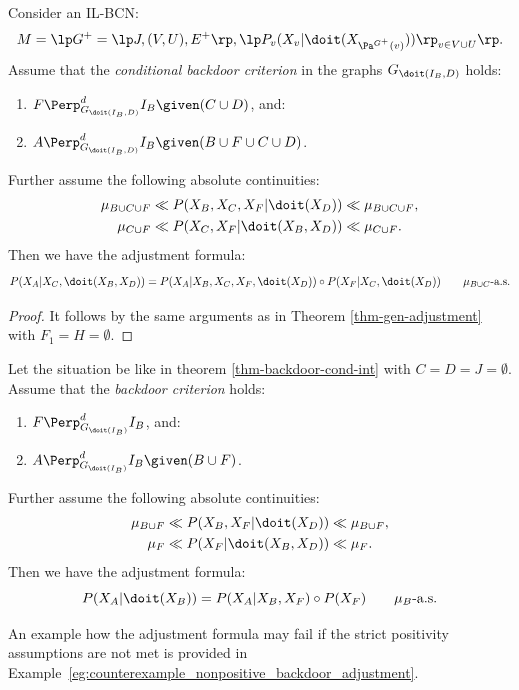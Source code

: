 \begin{Cor}
    \label{thm-backdoor-cond-int}
    Consider an IL-BCN:
        \[M= \lp G^+=\lp J,(V,U),E^+ \rp, \lp P_v ( X_v|\doit( X_{\Pa^{G^+}(v)})) \rp_{v \in V \cup U} \rp.\]
  Assume that the \emph{conditional backdoor criterion} in the graphs $G_{\doit(I_B,D)}$ holds:
\begin{enumerate}
    \item $\displaystyle F \Perp^d_{G_{\doit(I_B,D)}} I_B  \given (C \cup D)$, and:
    \item $\displaystyle A \Perp^d_{G_{\doit(I_B,D)}} I_B  \given (B \cup F \cup C \cup D)$.
\end{enumerate}
    Further assume the following absolute continuities:
  \begin{align*}
      \mu_{B \cup C \cup F} &\ll  P(X_B,X_C,X_F|\doit(X_D)) \ll \mu_{B \cup C \cup F},\\
      \mu_{C \cup F} &\ll  P(X_C,X_F|\doit(X_B,X_D)) \ll \mu_{C \cup F}.
  \end{align*}
Then we have the adjustment formula: 
\[ P(X_A|X_C,\doit(X_B,X_D)) = P(X_A|X_B,X_C,X_F,\doit(X_D)) \circ P(X_F|X_C,\doit(X_D)) \qquad \mu_{B \cup C}\text{-a.s.} \]
\begin{proof}
    It follows by the same arguments as in Theorem \ref{thm-gen-adjustment} with $F_1=H=\emptyset$.
\end{proof}
\end{Cor}


\begin{Cor}\label{cor:backdoor_adjustment}
    Let the situation be like in theorem \ref{thm-backdoor-cond-int} with $C=D=J= \emptyset$.
    Assume that the \emph{backdoor criterion} holds:
\begin{enumerate}
    \item $\displaystyle F \Perp^d_{G_{\doit(I_B)}} I_B$, and:
    \item $\displaystyle A \Perp^d_{G_{\doit(I_B)}} I_B  \given (B \cup F)$.
\end{enumerate}
    Further assume the following absolute continuities:
  \begin{align*}
      \mu_{B \cup F} &\ll  P(X_B,X_F|\doit(X_D)) \ll \mu_{B \cup F},\\
      \mu_{F} &\ll  P(X_{ F}|\doit(X_B,X_D)) \ll \mu_{ F}.
  \end{align*}
Then we have the adjustment formula: 
\[ P(X_A|\doit(X_B)) = P(X_A|X_B,X_F) \circ P(X_F)  \qquad \mu_B\text{-a.s.} \]
\end{Cor}

\begin{Rem}
An example how the adjustment formula may fail if the strict positivity assumptions are not met is provided in Example~\ref{eg:counterexample_nonpositive_backdoor_adjustment}.
\end{Rem}
